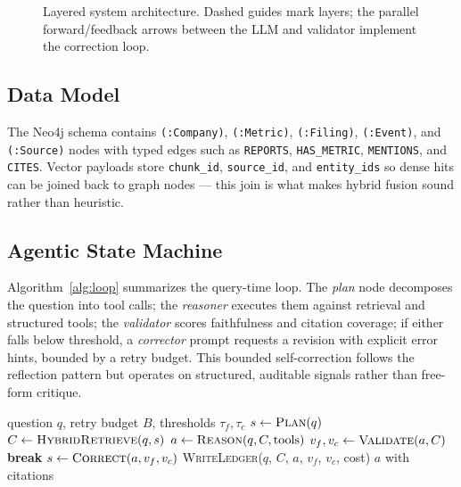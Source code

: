\documentclass[conference]{IEEEtran}
\begin{document}
\begin{figure}[t]
{%
}
\caption{Layered system architecture. Dashed guides mark layers; the parallel forward/feedback arrows between the LLM and validator implement the correction loop.}
\label{fig:arch}
\end{figure}
\subsection{Data Model}
The Neo4j schema contains \texttt{(:Company)}, \texttt{(:Metric)}, \texttt{(:Fil\-ing)}, \texttt{(:Event)}, and \texttt{(:Source)} nodes with typed edges such as \texttt{REPORTS}, \texttt{HAS\_METRIC}, \texttt{MENTIONS}, and \texttt{CITES}. Vector payloads store \texttt{chunk\_id}, \texttt{source\_id}, and \texttt{entity\_ids} so dense hits can be joined back to graph nodes --- this join is what makes hybrid fusion sound rather than heuristic.

\subsection{Agentic State Machine}
Algorithm~\ref{alg:loop} summarizes the query-time loop. The \emph{plan} node decomposes the question into tool calls; the \emph{reasoner} executes them against retrieval and structured tools; the \emph{validator} scores faithfulness and citation coverage; if either falls below threshold, a \emph{corrector} prompt requests a revision with explicit error hints, bounded by a retry budget. This bounded self-correction follows the reflection pattern \cite{shinn2023reflexion} but operates on structured, auditable signals rather than free-form critique.

\begin{algorithm}[t]
\caption{Query-time agent loop}
\label{alg:loop}
\begin{algorithmic}[1]
\Require question $q$, retry budget $B$, thresholds $\tau_f,\tau_c$
\State $s \gets \textsc{Plan}(q)$
\State $C \gets \textsc{HybridRetrieve}(q, s)$ 
  \State $a \gets \textsc{Reason}(q, C, \text{tools})$
  \State $v_f, v_c \gets \textsc{Validate}(a, C)$
   \textbf{break} \EndIf
  \State $s \gets \textsc{Correct}(a, v_f, v_c)$ 
\EndFor
\State \textsc{WriteLedger}($q$, $C$, $a$, $v_f$, $v_c$, cost)
\State \Return $a$ with citations
\end{algorithmic}
\end{algorithm}
\end{document}
